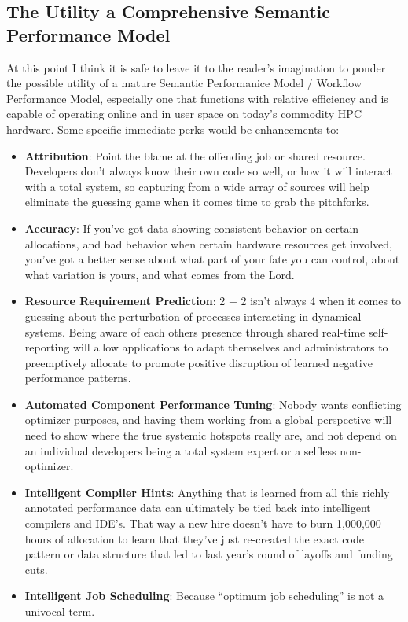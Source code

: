 
\subsection{The Utility a Comprehensive Semantic Performance Model}

At this point I think it is safe to leave it to the reader's
imagination to ponder the possible utility of a mature Semantic
Performanice Model / Workflow Performance Model, especially one
that functions with relative efficiency and is capable of operating
online and in user space on today's commodity HPC hardware.
Some specific immediate perks would be enhancements to:
\begin{itemize}
\item \textbf{Attribution}: Point the blame at the offending job or shared
  resource. Developers don't always know their own code so well,
  or how it will interact with a total system, so capturing from a
  wide array of sources will help eliminate the guessing game when it
  comes time to grab the pitchforks.
\item \textbf{Accuracy}: If you've got data showing consistent behavior on
      certain allocations, and bad behavior when certain hardware resources
      get involved, you've got a better sense about what part of your
      fate you can control, about what variation is yours, and what comes
      from the Lord.
\item \textbf{Resource Requirement Prediction}: 2 + 2 isn't always 4 when it
      comes to guessing about the perturbation of processes interacting in
      dynamical systems. Being aware of each others presence through shared
      real-time self-reporting will allow applications to adapt themselves
      and administrators to preemptively allocate to promote positive
      disruption of learned negative performance patterns.
\item \textbf{Automated Component Performance Tuning}: Nobody wants conflicting
  optimizer purposes, and having them working from a global perspective will
  need to show where the true systemic hotspots really are, and not depend on
  an individual developers being a total system expert or a selfless non-optimizer.
\item \textbf{Intelligent Compiler Hints}: Anything that is learned from all
      this richly annotated performance data can ultimately be tied back
      into intelligent compilers and IDE's. That way a new hire doesn't have
      to burn 1,000,000 hours of allocation to learn that they've just
      re-created the exact code pattern or data structure that led to last
      year's round of layoffs and funding cuts.
\item \textbf{Intelligent Job Scheduling}: Because ``optimum job scheduling''
      is not a univocal term.
\end{itemize}

